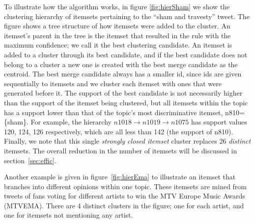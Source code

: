 \documentclass[letterpaper,12pt,titlepage,oneside,final]{book}
\begin{document}
To illustrate 
how the algorithm works,
in figure \ref{fig:hierSham} we show the clustering hierarchy of itemsets pertaining to
the ``sham and travesty'' tweet.
The figure shows a tree structure of how itemsets 
were added to the cluster.
An itemset's parent in the tree is the itemset
that resulted in the rule with the maximum confidence;
we call it the best clustering candidate.
An itemset is added to a cluster
through its best candidate, 
and if the best candidate 
does not belong to a cluster
a new one is created with 
the best merge candidate as the centroid.
The best merge candidate always has a smaller id, 
since ids are given sequentially to itemsets 
and we cluster each itemset with ones that were
generated before it.
The support of the best candidate is not necessarily higher than
the support of the itemset being clustered, 
but all itemsets within the topic has a support lower 
than that of the topic's most discriminative itemset, n810=\{sham\}. %
For example, the hierarchy $n1018 \rightarrow n1019 \rightarrow n1075$
has support values 120, 124, 126 respectively, 
which are all less than 142 (the support of n810). %
Finally, we note that 
this single \emph{strongly closed itemset} cluster 
replaces 26  \emph{distinct} itemsets. 
The overall reduction in the number of itemsets will 
be discussed in section~\ref{sec:effic}. %

Another example is given in figure~\ref{fig:hierEma} to illustrate %
an itemset that branches into different opinions within one topic.
These itemsets are mined from tweets of 
fans voting for different artists to win the MTV Europe Music Awards (MTVEMA).
There are 4 distinct clusters in the figure; one for each artist, and one for
itemsets not mentioning any artist.
\end{document}
